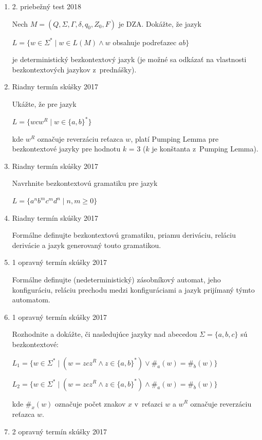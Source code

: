\documentclass[11pt,a4paper]{article}
\begin{document}
\begin{enumerate}
		\item 2. priebežný test 2018

		Nech $M = (Q, \Sigma, \Gamma, \delta, q_0, Z_0, F)$ je DZA. Dokážte, že jazyk

		$L = \{w \in \Sigma^* \mid w \in L(M) \land w$ obsahuje podreťazec $ab\}$

		je deterministický bezkontextový jazyk (je možné sa odkázať na vlastnosti bezkontextových jazykov z~prednášky).

		\item Riadny termín skúšky 2017

		Ukážte, že pre jazyk

		$L = \{wcw^R \mid w \in \{a,b\}^*\}$

		kde $w^R$ označuje reverzáciu reťazca $w$, platí Pumping Lemma pre bezkontextové jazyky pre hodnotu $k$ = 3 ($k$ je konštanta z~Pumping Lemma).

		\item Riadny termín skúšky 2017

		Navrhnite bezkontextovú gramatiku pre jazyk

		$L = \{a^nb^mc^md^n \mid n,m \geq 0\}$

		\item Riadny termín skúšky 2017

		Formálne definujte bezkontextovú gramatiku, priamu deriváciu, reláciu derivácie a jazyk generovaný touto gramatikou.

		\item 1 opravný termín skúšky 2017

		Formálne definujte (nedeterministický) zásobníkový automat, jeho konfiguráciu, reláciu prechodu medzi konfiguráciami a jazyk prijímaný týmto automatom.

		\item 1 opravný termín skúšky 2017

		Rozhodnite a dokážte, či nasledujúce jazyky nad abecedou $\Sigma = \{a,b,c\}$ sú bezkontextové:

		$L_1 = \{w \in \Sigma^* \mid (w = zcz^R \land z \in \{a,b\}^*) \lor \#_a(w) = \#_b(w)\}$

		$L_2 = \{w \in \Sigma^* \mid (w = zcz^R \land z \in \{a,b\}^*) \land \#_a(w) = \#_b(w)\}$

		kde $\#_x(w)$ označuje počet znakov $x$ v~reťazci $w$ a $w^R$ označuje reverzáciu reťazca $w$.

		\item 2 opravný termín skúšky 2017


\end{enumerate}
\end{document}
